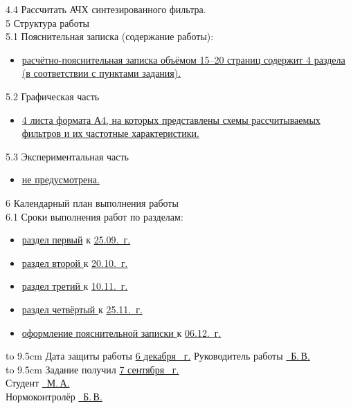4.4 Рассчитать АЧХ синтезированного фильтра.\\
5 Структура работы\\
5.1 Пояснительная записка (содержание работы):
\begin{itemize}
\item \uline{расчётно-пояснительная записка объёмом 15--20 страниц
    со\-держит 4 раздела (в соответствии с пунктами
    задания). \hfill}
\end{itemize}
5.2 Графическая часть
\begin{itemize}
\item \uline{4 листа формата А4, на которых представлены схемы
    рас\-считываемых фильтров и их частотные характеристики.\hfill}
\end{itemize}
5.3 Экспериментальная часть
\begin{itemize}
\item \uline{не предусмотрена.\hfill}
\end{itemize}
6 Календарный план выполнения работы\\
6.1 Сроки выполнения работ по разделам:
\begin{itemize}
\item \uline{раздел первый\hfill}
  к \uline{25.09.\the\year~г. }
\item \uline{раздел второй \hfill} к \uline{20.10.\the\year~г.}
\item \uline{раздел третий \hfill} к \uline{10.11.\the\year~г.}
\item \uline{раздел четвёртый \hfill} к \uline{25.11.\the\year~г.}
\item \uline{оформление пояснительной записки \hfill} к \uline{06.12.\the\year~г.}

\end{itemize}
\hbox to 9.5cm {Дата защиты работы \uline{\hfill 6 декабря \the\year~г.}}
Руководитель работы \uline{~Б.\,В.}\\
\hbox to 9.5cm {Задание получил \uline{\hfill7 сентября \the\year~г.}}\\
Студент    \uline{~М.\,А.}\\
Нормоконтролёр    \uline{~Б.\,В.}\\
\newpage



